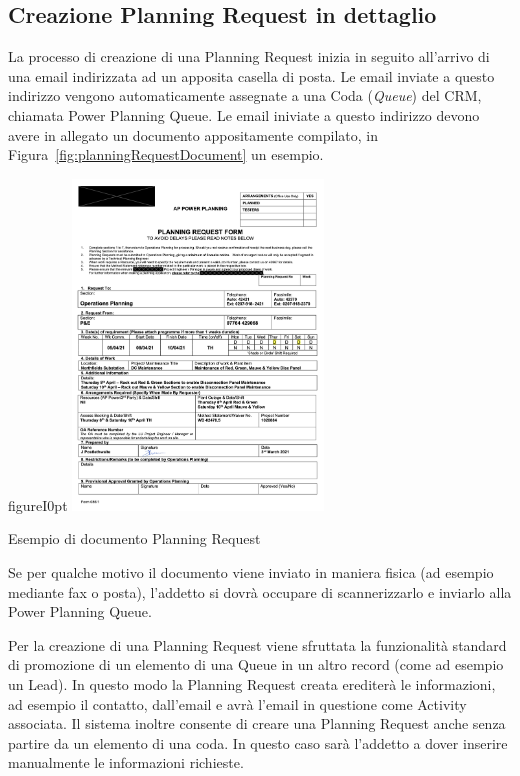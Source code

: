 \subsection{Creazione Planning Request in dettaglio}
La processo di creazione di una Planning Request inizia in seguito all'arrivo di una email indirizzata ad un apposita casella di posta. Le email inviate a questo indirizzo vengono automaticamente assegnate a una Coda (\textit{Queue}) del CRM, chiamata Power Planning Queue. Le email iniviate a questo indirizzo devono avere in allegato un documento appositamente compilato, in Figura~\ref{fig:planningRequestDocument} un esempio.
\begin{wrapfloat}{figure}{I}{0pt}
  \centering
  \includegraphics[width=0.5\textwidth]{planning-request-document.png}
  \caption{Esempio di documento Planning Request}
  \label{fig:planningRequestDocument}
\end{wrapfloat}

Se per qualche motivo il documento viene inviato in maniera fisica (ad esempio mediante fax o posta), l'addetto si dovrà occupare di scannerizzarlo e inviarlo alla Power Planning Queue.


Per la creazione di una Planning Request viene sfruttata la funzionalità standard di promozione di un elemento di una Queue in un altro record (come ad esempio un Lead). In questo modo la Planning Request creata erediterà le informazioni, ad esempio il contatto, dall'email e avrà l'email in questione come Activity associata. 
Il sistema inoltre consente di creare una Planning Request anche senza partire da un elemento di una coda. In questo caso sarà l'addetto a dover inserire manualmente le informazioni richieste. 

